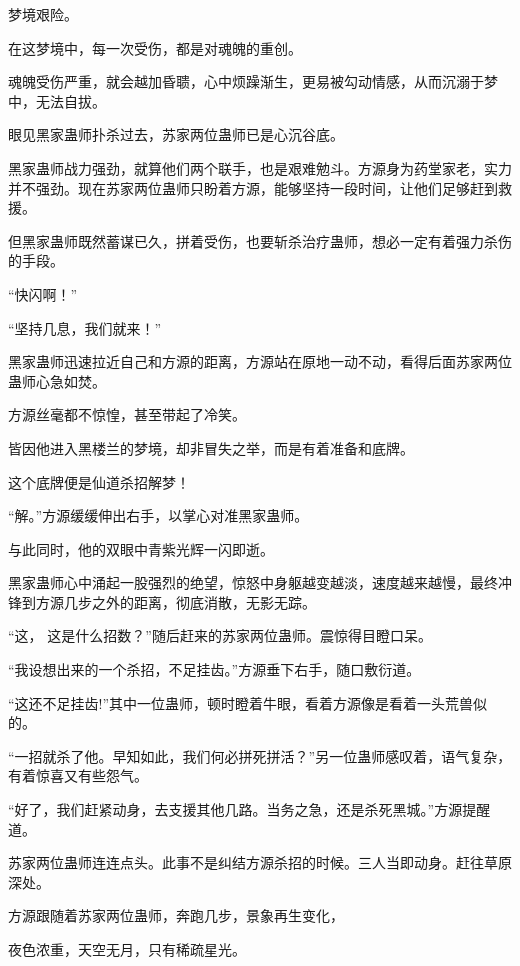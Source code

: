
\begin{this_body}

梦境艰险。

在这梦境中，每一次受伤，都是对魂魄的重创。

魂魄受伤严重，就会越加昏聩，心中烦躁渐生，更易被勾动情感，从而沉溺于梦中，无法自拔。

眼见黑家蛊师扑杀过去，苏家两位蛊师已是心沉谷底。

黑家蛊师战力强劲，就算他们两个联手，也是艰难勉斗。方源身为药堂家老，实力并不强劲。现在苏家两位蛊师只盼着方源，能够坚持一段时间，让他们足够赶到救援。

但黑家蛊师既然蓄谋已久，拼着受伤，也要斩杀治疗蛊师，想必一定有着强力杀伤的手段。

“快闪啊！”

“坚持几息，我们就来！”

黑家蛊师迅速拉近自己和方源的距离，方源站在原地一动不动，看得后面苏家两位蛊师心急如焚。

方源丝毫都不惊惶，甚至带起了冷笑。

皆因他进入黑楼兰的梦境，却非冒失之举，而是有着准备和底牌。

这个底牌便是仙道杀招解梦！

“解。”方源缓缓伸出右手，以掌心对准黑家蛊师。

与此同时，他的双眼中青紫光辉一闪即逝。

黑家蛊师心中涌起一股强烈的绝望，惊怒中身躯越变越淡，速度越来越慢，最终冲锋到方源几步之外的距离，彻底消散，无影无踪。

“这， 这是什么招数？”随后赶来的苏家两位蛊师。震惊得目瞪口呆。

“我设想出来的一个杀招，不足挂齿。”方源垂下右手，随口敷衍道。

“这还不足挂齿!”其中一位蛊师，顿时瞪着牛眼，看着方源像是看着一头荒兽似的。

“一招就杀了他。早知如此，我们何必拼死拼活？”另一位蛊师感叹着，语气复杂，有着惊喜又有些怨气。

“好了，我们赶紧动身，去支援其他几路。当务之急，还是杀死黑城。”方源提醒道。

苏家两位蛊师连连点头。此事不是纠结方源杀招的时候。三人当即动身。赶往草原深处。

方源跟随着苏家两位蛊师，奔跑几步，景象再生变化，

夜色浓重，天空无月，只有稀疏星光。


\end{this_body}

